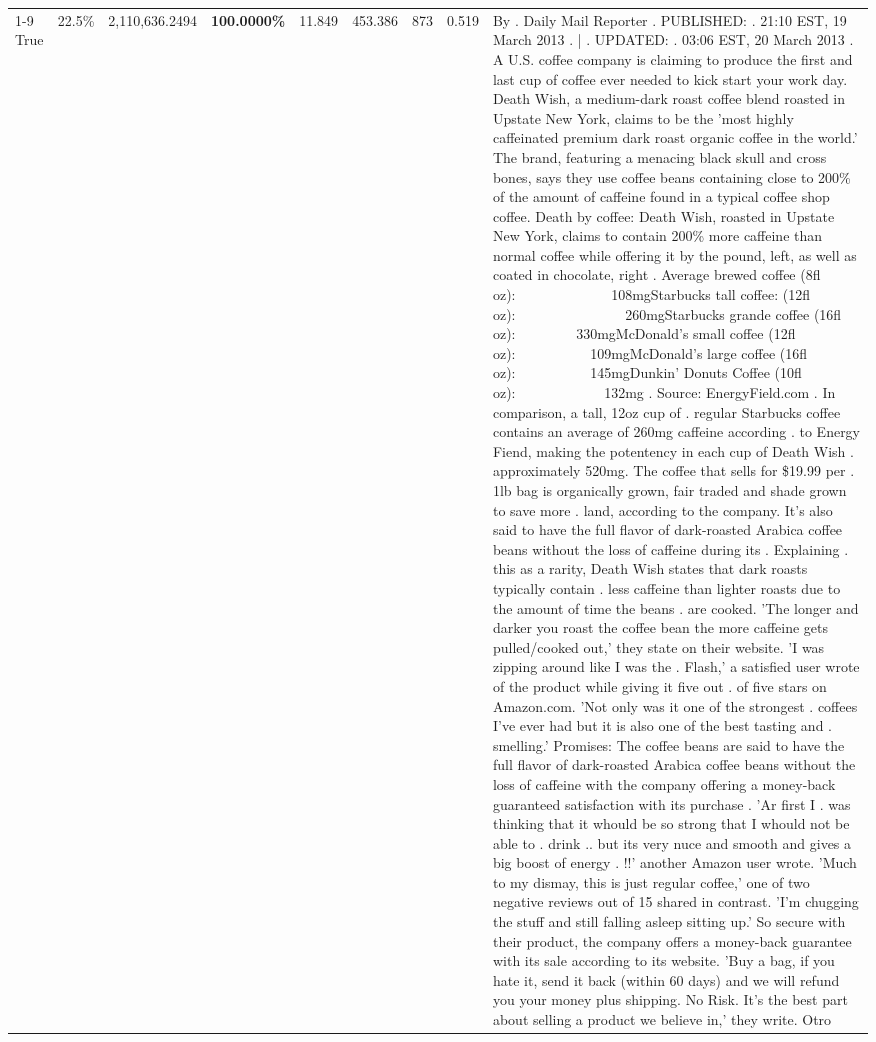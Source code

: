 \begin{table}[H]
{\begin{tabular}{lllrlllll}
\cline{1-9}
True & 22.5\% & 2,110,636.2494 & \bfseries \color{red} 100.0000\% & 11.849 & 453.386 & 873 & 0.519 & By . Daily Mail Reporter . PUBLISHED: . 21:10 EST, 19 March 2013 . | . UPDATED: . 03:06 EST, 20 March 2013 . A U.S. coffee company is claiming to produce the first and last cup of coffee ever needed to kick start your work day. Death Wish, a medium-dark roast coffee blend roasted in Upstate New York, claims to be the 'most highly caffeinated premium dark roast organic coffee in the world.' The brand, featuring a menacing black skull and cross bones, says they use coffee beans containing close to 200\% of the amount of caffeine found in a typical coffee shop coffee. Death by coffee: Death Wish, roasted in Upstate New York, claims to contain 200\% more caffeine than normal coffee while offering it by the pound, left, as well as coated in chocolate, right . Average brewed coffee (8fl oz):              108mgStarbucks tall coffee: (12fl oz):                260mgStarbucks grande coffee (16fl oz):         330mgMcDonald's small coffee (12fl oz):           109mgMcDonald's large coffee (16fl oz):           145mgDunkin' Donuts Coffee (10fl oz):             132mg . Source: EnergyField.com . In comparison, a tall, 12oz cup of . regular Starbucks coffee contains an average of 260mg caffeine according . to Energy Fiend, making the potentency in each cup of Death Wish . approximately 520mg. The coffee that sells for \$19.99 per . 1lb bag is organically grown, fair traded and shade grown to save more . land, according to the company. It's also said to have the full flavor of dark-roasted Arabica coffee beans without the loss of caffeine during its . Explaining . this as a rarity, Death Wish states that dark roasts typically contain . less caffeine than lighter roasts due to the amount of time the beans . are cooked. 'The longer and darker you roast the coffee bean the more caffeine gets pulled/cooked out,' they state on their website. 'I was zipping around like I was the . Flash,' a satisfied user wrote of the product while giving it five out . of five stars on Amazon.com. 'Not only was it one of the strongest . coffees I've ever had but it is also one of the best tasting and . smelling.’ Promises: The coffee beans are said to have the full flavor of dark-roasted Arabica coffee beans without the loss of caffeine with the company offering a money-back guaranteed satisfaction with its purchase . 'Ar first I . was thinking that it whould be so strong that I whould not be able to . drink .. but its very nuce and smooth and gives a big boost of energy . !!' another Amazon user wrote. 'Much to my dismay, this is just regular coffee,' one of two negative reviews out of 15 shared in contrast. 'I'm chugging the stuff and still falling asleep sitting up.' So secure with their product, the company offers a money-back guarantee with its sale according to its website. 'Buy a bag, if you hate it, send it back (within 60 days) and we will refund you your money plus shipping. No Risk. It’s the best part about selling a product we believe in,' they write. Otro \\

\end{tabular}}
\end{table}
